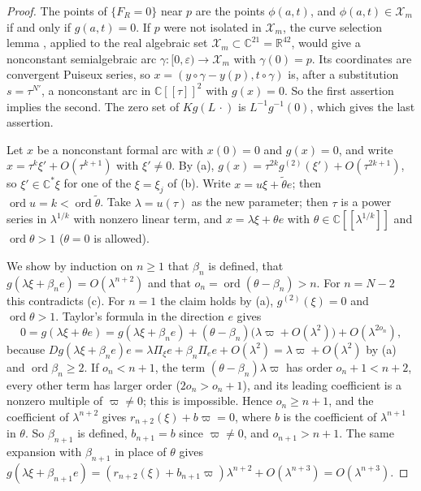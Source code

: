\documentclass[11pt]{amsart}
\theoremstyle{definition}
\theoremstyle{remark}
\newcommand{\C}{\mathbb{C}}
\newcommand{\R}{\mathbb{R}}
\newcommand{\ord}{\operatorname{ord}}
\begin{document}
\begin{proof}
The points of $\{F_R=0\}$ near $p$ are the points $\phi(a,t)$, and $\phi(a,t)\in\mathcal X_m$ if
and only if $g(a,t)=0$.  If $p$ were not isolated in $\mathcal X_m$, the curve selection lemma
\cite[Thm.~2.5.5]{BCR}, applied to the real algebraic set $\mathcal X_m\subset\C^{21}=\R^{42}$,
would give a nonconstant semialgebraic arc $\gamma\colon[0,\varepsilon)\to\mathcal X_m$ with
$\gamma(0)=p$.  Its
coordinates are convergent Puiseux series, so $x=(y\circ\gamma-y(p),t\circ\gamma)$ is, after a
substitution $s=\tau^{N'}$, a nonconstant arc in $\C[[\tau]]^2$ with $g(x)=0$.  So the first
assertion implies the second.  The zero set of $Kg(L\,\cdot)$ is $L^{-1}g^{-1}(0)$, which gives
the last assertion.

Let $x$ be a nonconstant formal arc with $x(0)=0$ and $g(x)=0$, and write
$x=\tau^k\xi'+O(\tau^{k+1})$ with $\xi'\ne0$.  By (a),
$g(x)=\tau^{2k}g^{(2)}(\xi')+O(\tau^{2k+1})$, so $\xi'\in\C^*\xi$ for one of the $\xi=\xi_j$
of (b).  Write $x=u\xi+\tilde\theta e$; then $\ord u=k<\ord\tilde\theta$.  Take $\lambda=u(\tau)$ as
the new parameter; then $\tau$ is a power series in $\lambda^{1/k}$ with nonzero linear term,
and $x=\lambda\xi+\theta e$ with $\theta\in\C[[\lambda^{1/k}]]$ and $\ord\theta>1$ ($\theta=0$ is
allowed).

We show by induction on $n\ge1$ that $\beta_n$ is defined, that
$g(\lambda\xi+\beta_ne)=O(\lambda^{n+2})$ and that $o_n=\ord(\theta-\beta_n)>n$.  For $n=N-2$
this contradicts (c).  For $n=1$ the claim holds by (a), $g^{(2)}(\xi)=0$ and $\ord\theta>1$.
Taylor's formula in the direction $e$ gives
\[
  0=g(\lambda\xi+\theta e)
   =g(\lambda\xi+\beta_ne)+(\theta-\beta_n)\bigl(\lambda\varpi+O(\lambda^2)\bigr)
    +O(\lambda^{2o_n}),
\]
because $Dg(\lambda\xi+\beta_ne)e=\lambda\Pi_\xi e+\beta_n\Pi_ee+O(\lambda^2)
=\lambda\varpi+O(\lambda^2)$ by (a) and $\ord\beta_n\ge2$.  If $o_n<n+1$, the term
$(\theta-\beta_n)\lambda\varpi$ has order $o_n+1<n+2$, every other term has larger order
($2o_n>o_n+1$), and its leading coefficient is a nonzero multiple of $\varpi\ne0$; this is
impossible.  Hence $o_n\ge n+1$, and the coefficient of $\lambda^{n+2}$ gives
$r_{n+2}(\xi)+b\varpi=0$, where $b$ is the coefficient of $\lambda^{n+1}$ in $\theta$.  So
$\beta_{n+1}$ is defined, $b_{n+1}=b$ since $\varpi\ne0$, and $o_{n+1}>n+1$.  The same expansion
with $\beta_{n+1}$ in place of $\theta$ gives
$g(\lambda\xi+\beta_{n+1}e)=(r_{n+2}(\xi)+b_{n+1}\varpi)\lambda^{n+2}+O(\lambda^{n+3})
=O(\lambda^{n+3})$.
\end{proof}
\end{document}
